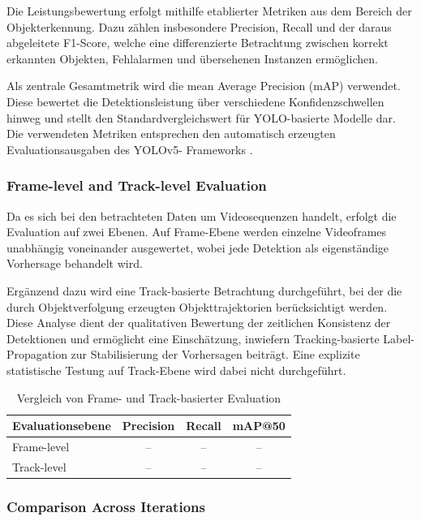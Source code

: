 Die Leistungsbewertung erfolgt mithilfe etablierter Metriken aus dem Bereich der 
Objekterkennung. Dazu zählen insbesondere Precision, Recall und der daraus 
abgeleitete F1-Score, welche eine differenzierte Betrachtung zwischen korrekt 
erkannten Objekten, Fehlalarmen und übersehenen Instanzen ermöglichen.

Als zentrale Gesamtmetrik wird die mean Average Precision (mAP) verwendet. Diese 
bewertet die Detektionsleistung über verschiedene Konfidenzschwellen hinweg und 
stellt den Standardvergleichswert für YOLO-basierte Modelle dar. Die verwendeten 
Metriken entsprechen den automatisch erzeugten Evaluationsausgaben des YOLOv5-
Frameworks \cite{ultralytics2024}.

\subsubsection{Frame-level and Track-level Evaluation}

Da es sich bei den betrachteten Daten um Videosequenzen handelt, erfolgt die 
Evaluation auf zwei Ebenen. Auf Frame-Ebene werden einzelne Videoframes unabhängig 
voneinander ausgewertet, wobei jede Detektion als eigenständige Vorhersage behandelt 
wird.

Ergänzend dazu wird eine Track-basierte Betrachtung durchgeführt, bei der die durch 
Objektverfolgung erzeugten Objekttrajektorien berücksichtigt werden. Diese Analyse 
dient der qualitativen Bewertung der zeitlichen Konsistenz der Detektionen und 
ermöglicht eine Einschätzung, inwiefern Tracking-basierte Label-Propagation zur 
Stabilisierung der Vorhersagen beiträgt. Eine explizite statistische Testung auf 
Track-Ebene wird dabei nicht durchgeführt.

\begin{table}[H]
\centering
\caption{Vergleich von Frame- und Track-basierter Evaluation}
\label{tab:frame_track_eval}
\begin{tabular}{lccc}
\hline
\textbf{Evaluationsebene} & \textbf{Precision} & \textbf{Recall} & \textbf{mAP@50} \\
\hline
Frame-level & -- & -- & -- \\
Track-level & -- & -- & -- \\
\hline
\end{tabular}
\end{table}

\subsubsection{Comparison Across Iterations}

